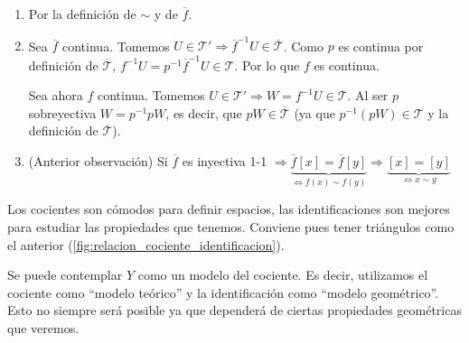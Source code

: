 \begin{demo}
\begin{enumerate}
    \item Por la definición de $\sim$ y de $\overline{f}$.
    \item Sea $\overline{f}$ continua. Tomemos $U \in \mathcal{T}' \Rightarrow \overline{f}^{-1}U \in \overline{\mathcal{T}}$. Como $p$ es continua por definición de $\overline{\mathcal{T}}$, $f^{-1} U = p^{-1} \overline{f}^{-1} U \in \mathcal{T}$. Por lo que $f$ es continua.

    Sea ahora $f$ continua. Tomemos $U \in \mathcal{T}' \Rightarrow W = f^{-1}U \in \mathcal{T}$. Al ser $p$ sobreyectiva $W = p^{-1}pW$, es decir, que $pW \in \overline{\mathcal{T}}$ (ya que $p^{-1}\left( p W \right) \in \mathcal{T}$ y la definición de $\overline{\mathcal{T}}$).

    \item (Anterior observación) Si $\overline{f}$ es inyectiva 1-1 $\Rightarrow \underbrace{\overline{f}\left[ x \right] = \overline{f}\left[ y \right]}_{\Leftrightarrow f\left( x \right) \sim f\left( y \right)} \Rightarrow \underbrace{\left[ x \right] = \left[ y \right]}_{\Leftrightarrow x \sim y}$
\end{enumerate}
\end{demo}

\begin{pg}
    Los cocientes son cómodos para definir espacios, las identificaciones son mejores para estudiar las propiedades que tenemos. Conviene pues tener triángulos como el anterior (\ref{fig:relacion_cociente_identificacion}). 

    Se puede contemplar $Y$ como un modelo del cociente. Es decir, utilizamos el cociente como ``modelo teórico'' y la identificación como ``modelo geométrico''. Esto no siempre será posible ya que dependerá de ciertas propiedades geométricas que veremos.
\end{pg}

